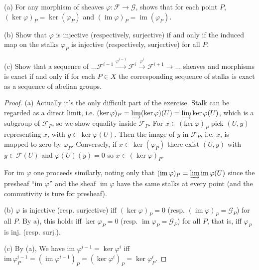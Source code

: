 \begin{exe}
	\label{2.1.2}
	(a) For any morphism of sheaves $\varphi : \mathscr{F} \rightarrow \mathscr{G}$,  shows that for each point $P$, $(\ker \varphi)_{P}=\operatorname{ker}(\varphi_{P})$ and $(\operatorname{im} \varphi)_{P}=\operatorname{im}(\varphi_{P})$.
	
	(b) Show that $\varphi$ is injective (respectively, surjective) if and only if the induced map on the stalks $\varphi_{P}$ is injective (respectively,  surjective) for all $P$.
	
	(c) Show that a sequence of  $\dots\mathscr{F}^{i-1}\xrightarrow{\varphi^{i-1}}\mathscr{F}^{i} \xrightarrow{\varphi^{i}}\mathscr{F}^{i+1}\longrightarrow\dots$  sheaves and morphisms is exact if and only if for each $P \in X$ the corresponding sequence of stalks is exact as a sequence of abelian groups.
	
\end{exe}
\begin{proof}
	(a) Actually it's the only difficult part of the exercise.  Stalk can be regarded as a direct limit, i.e.  $(\operatorname{ker} \varphi)_{P}=\varinjlim(\operatorname{ker} \varphi)(U)=\varinjlim\operatorname{ker} \varphi(U)$,  which is a subgroup of $\mathscr{F}_{P}$,  so we show equality inside $\mathscr{F}_{P}$.  For $x \in(\text {ker}\, \varphi)_{P}$ pick $(U, y)$ representing $x$, with $y \in \operatorname{ker} \varphi(U)$. Then the image of $y$ in $\mathscr{F}_{P}$,  i.e. $x$,  is mapped to zero by $\varphi_{P}$. Conversely,  if $x \in \ker (\varphi_{P})$ there exist $(U, y)$ with $y \in \mathscr{F}(U)$ and $\varphi(U)(y)=0$ so $x\in(\operatorname{ker} \varphi)_{P}$.
	
	For im $\varphi$ one proceeds similarly,  noting only that $(\operatorname{im} \varphi)_{P}=\varinjlim{\text{im}\,\varphi(U)}$ since the presheaf ``im $\varphi$'' and the sheaf $\operatorname{im} \varphi$ have the same stalks at every point (and the commutivity is ture for presheaf).
	
	(b) $\varphi$ is injective (resp.  surjective) iff $(\operatorname{ker} \varphi)_{P}=0$ (resp. $(\operatorname{im} \varphi)_{P}=\mathscr{G}_{P}$) for all $P$.  By a), this holds iff $\ker \varphi_{P}=0$ (resp. $\operatorname{im} \varphi_{P}=\mathscr{G}_{P}$) for all $P$, that is, iff $\varphi_{P}$ is inj. (resp. surj.).
	
	(c) By (a),  We have im $\varphi^{i-1}=\operatorname{ker} \varphi^{i}$ iff $\mathrm{im}\, \varphi_{P}^{i-1}=(\operatorname{im} \varphi^{i-1})_{P}=(\operatorname{ker} \varphi^{i})_{P}=\operatorname{ker} \varphi_{P}^{i}$.
\end{proof}
